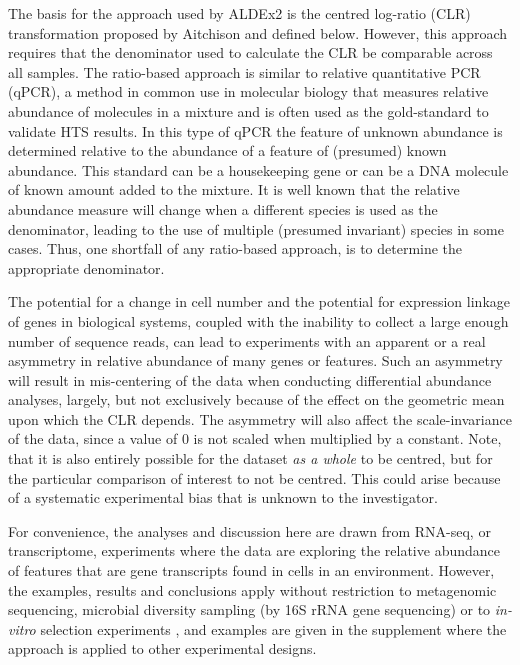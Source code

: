 \documentclass{bmcart}
\begin{document}
The basis for the approach used by ALDEx2 is the centred log-ratio (CLR) transformation proposed by Aitchison \cite{Aitchison:1986} and defined below. However, this approach requires that the denominator used to calculate the CLR be comparable across all samples.  The ratio-based approach is  similar to relative quantitative PCR (qPCR), a method in common use in molecular biology that measures relative abundance of molecules in a mixture \cite{Thellin:1999aa,Vandesompele:2002aa} and is often used as the gold-standard to validate HTS results. In this type of qPCR the feature of unknown abundance is determined relative to the abundance of a feature of (presumed) known abundance. This standard can be a housekeeping gene or can be a DNA molecule of known amount added to the mixture. It is well known that the relative abundance measure will change when a different species is used as the denominator, leading to the use of multiple (presumed invariant) species in some cases. Thus, one shortfall of any ratio-based approach, is to determine the appropriate denominator. 

The potential for a change in cell number and the potential for expression linkage of genes in biological systems, coupled with the inability to collect a large enough number of sequence reads, can lead to experiments with an apparent or a real asymmetry in relative abundance of many genes or features. Such an asymmetry will result in mis-centering of the data when conducting differential abundance analyses, largely, but not exclusively because of the effect on the geometric mean upon which the CLR depends. The asymmetry will also affect the scale-invariance of the data, since a value of 0 is not scaled when multiplied by a constant. Note, that it is also entirely possible for the dataset \emph{as a whole} to be centred, but for the particular comparison of interest to not be centred. This could arise because of a systematic experimental bias that is unknown to the investigator. 



For convenience, the analyses and discussion here are drawn from RNA-seq, or transcriptome, experiments where the data are exploring the relative abundance of features that are gene transcripts found in cells in an environment. However, the examples, results and conclusions apply without restriction to metagenomic sequencing, microbial diversity sampling (by 16S rRNA gene sequencing) or to \textit{in-vitro} selection experiments \cite{fernandes:2014,mcmurrough:2014,gloorFrontiers:2017}, and  examples are given in the supplement where the approach is applied to other experimental designs. 
\end{document}
